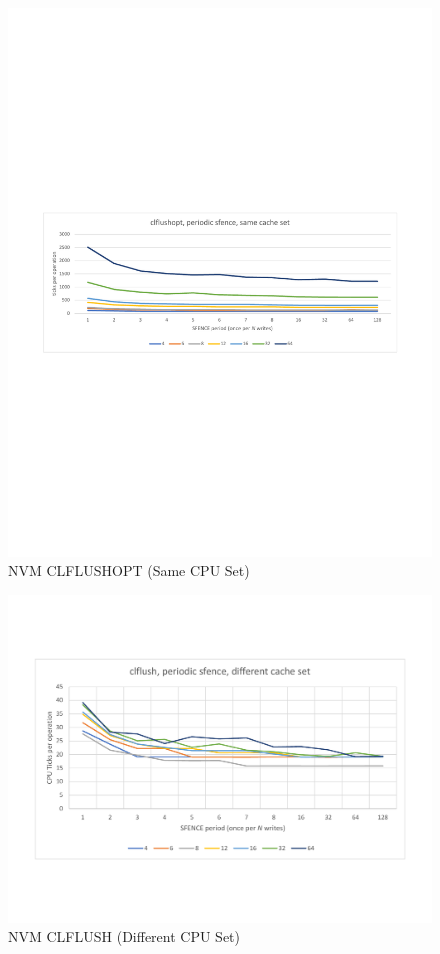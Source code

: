 \begin{figure}
    \centering
    \caption{NVM CLFLUSHOPT (Same CPU Set)}\label{micro:clflushopt:same}
    \includegraphics[scale=0.35]{micro/nvm-clflushopt-periodic-same.pdf}
\end{figure}

\begin{figure}
    \centering
    \caption{NVM CLFLUSH (Different CPU Set)}\label{micro:clflush:different}
    \includegraphics[scale=0.35]{micro/nvm-clflush-periodic-different.pdf}
\end{figure}

